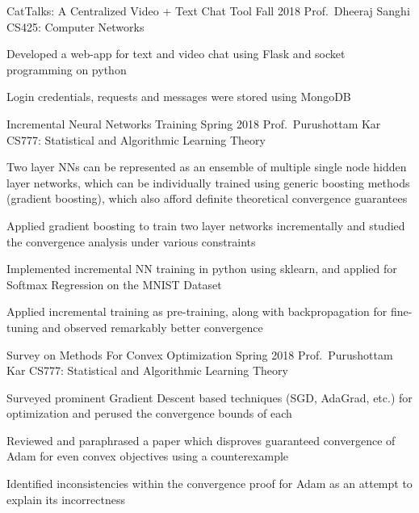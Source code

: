\cventry
	{CatTalks: A Centralized Video + Text Chat Tool}
	{Fall 2018}
	{Prof.\ Dheeraj Sanghi}
	{CS425: Computer Networks}
	{%
		\begin{cvitems}
            \item Developed a web-app for text and video chat using Flask and socket programming on python
            \item Login credentials, requests and messages were stored using MongoDB
		\end{cvitems}
	}

\cventry
	{Incremental Neural Networks Training}
	{Spring 2018}
	{Prof.\ Purushottam Kar}
	{CS777: Statistical and Algorithmic Learning Theory}
	{%
		\begin{cvitems}
            \item Two layer NNs can be represented as an ensemble of multiple single node hidden layer networks, which can be individually trained using generic boosting methods (gradient boosting), which also afford definite theoretical convergence guarantees
            \item Applied gradient boosting to train two layer networks incrementally and studied the convergence analysis under various constraints
            \item Implemented incremental NN training in python using sklearn, and applied for Softmax Regression on the MNIST Dataset
            \item Applied incremental training as pre-training, along with backpropagation for fine-tuning and observed remarkably better convergence
		\end{cvitems}
	}

\cventry
	{Survey on Methods For Convex Optimization}
	{Spring 2018}
	{Prof.\ Purushottam Kar}
	{CS777: Statistical and Algorithmic Learning Theory}
	{%
		\begin{cvitems}
            \item Surveyed prominent Gradient Descent based techniques (SGD, AdaGrad, etc.) for optimization and perused the convergence bounds of each
            \item Reviewed and paraphrased a paper which disproves guaranteed convergence of Adam for even convex objectives using a counterexample
            \item Identified inconsistencies within the convergence proof for Adam as an attempt to explain its incorrectness
		\end{cvitems}
	}

